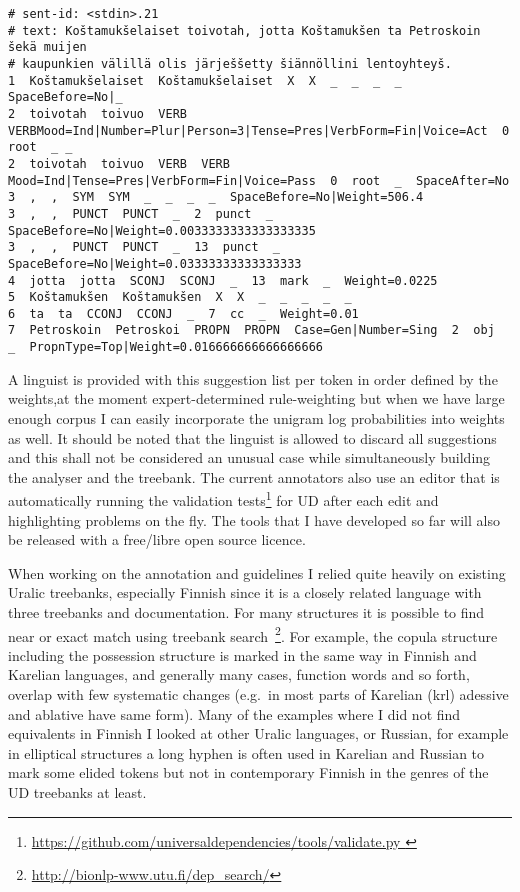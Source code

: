 \documentclass[11pt]{article}
\begin{document}
\begin{scriptsize}
\begin{verbatim}
# sent-id: <stdin>.21
# text: Koštamukšelaiset toivotah, jotta Koštamukšen ta Petroskoin šekä muijen
# kaupunkien välillä olis järješšetty šiännöllini lentoyhteyš.
1  Koštamukšelaiset  Koštamukšelaiset  X  X  _  _  _  _  SpaceBefore=No|_
2  toivotah  toivuo  VERB  VERBMood=Ind|Number=Plur|Person=3|Tense=Pres|VerbForm=Fin|Voice=Act  0  root  _ _
2  toivotah  toivuo  VERB  VERB  Mood=Ind|Tense=Pres|VerbForm=Fin|Voice=Pass  0  root  _  SpaceAfter=No
3  ,  ,  SYM  SYM  _  _  _  _  SpaceBefore=No|Weight=506.4
3  ,  ,  PUNCT  PUNCT  _  2  punct  _  SpaceBefore=No|Weight=0.0033333333333333335
3  ,  ,  PUNCT  PUNCT  _  13  punct  _  SpaceBefore=No|Weight=0.03333333333333333
4  jotta  jotta  SCONJ  SCONJ  _  13  mark  _  Weight=0.0225
5  Koštamukšen  Koštamukšen  X  X  _  _  _  _  _
6  ta  ta  CCONJ  CCONJ  _  7  cc  _  Weight=0.01
7  Petroskoin  Petroskoi  PROPN  PROPN  Case=Gen|Number=Sing  2  obj  _  PropnType=Top|Weight=0.016666666666666666
\end{verbatim}
\end{scriptsize}

A linguist is provided with this suggestion list per token in order defined by
the weights,at the moment expert-determined rule-weighting but when we have
large enough corpus I can easily incorporate the unigram log probabilities into
weights as well. It should be noted that the linguist is allowed to discard all
suggestions and this shall not be considered an unusual case while
simultaneously building the analyser and the treebank. The current annotators
also use an editor that is automatically running the validation
tests\footnote{\url{https://github.com/universaldependencies/tools/validate.py
}} for UD after each edit and highlighting problems on the fly. The tools that
I have developed so far will also be released with a free/libre open source
licence.

When working on the annotation and guidelines I relied quite heavily on
existing Uralic treebanks, especially Finnish since it is a closely related
language with three treebanks and documentation. For many structures it is
possible to find near or exact match using treebank
search~\footnote{\url{http://bionlp-www.utu.fi/dep_search/}}. For example, the
copula structure including the possession structure is marked in the same way in
Finnish and Karelian languages, and generally many cases, function words and so
forth, overlap with few systematic changes (e.g.\ in most parts of Karelian
(krl) adessive and ablative have same form). Many of the examples where I did
not find equivalents in Finnish I looked at other Uralic languages, or Russian,
for example in elliptical structures a long hyphen is often used in Karelian and
Russian to mark some elided tokens but not in contemporary Finnish in the genres
of the UD treebanks at least.
\end{document}
